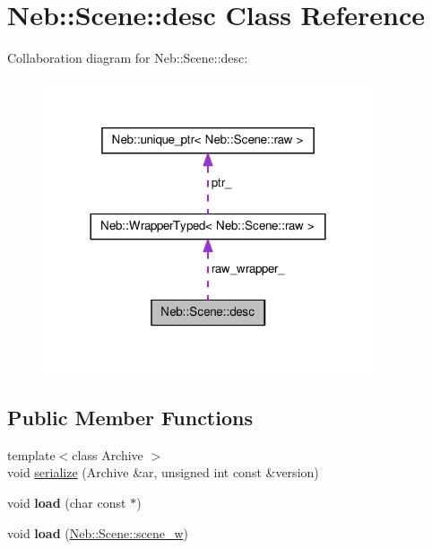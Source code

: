 \hypertarget{classNeb_1_1Scene_1_1desc}{\section{\-Neb\-:\-:\-Scene\-:\-:desc \-Class \-Reference}
\label{classNeb_1_1Scene_1_1desc}
}


\-Collaboration diagram for \-Neb\-:\-:\-Scene\-:\-:desc\-:
\nopagebreak
\begin{figure}[H]
\begin{center}
\leavevmode
\includegraphics[width=276pt]{classNeb_1_1Scene_1_1desc__coll__graph}
\end{center}
\end{figure}
\subsection*{\-Public \-Member \-Functions}
\begin{DoxyCompactItemize}
\item 
{\footnotesize template$<$class Archive $>$ }\\void \hyperlink{classNeb_1_1Scene_1_1desc_aa456a9a431a4f93be8278f6aee75b8f6}{serialize} (\-Archive \&ar, unsigned int const \&version)
\item 
\hypertarget{classNeb_1_1Scene_1_1desc_a79c8deb52884deccaef462c6ce6866a6}{void {\bfseries load} (char const $\ast$)}\label{classNeb_1_1Scene_1_1desc_a79c8deb52884deccaef462c6ce6866a6}

\item 
\hypertarget{classNeb_1_1Scene_1_1desc_aa1152d0cc91bd6585c5074c20bc49ff9}{void {\bfseries load} (\hyperlink{classNeb_1_1weak__ptr}{\-Neb\-::\-Scene\-::scene\-\_\-w})}\label{classNeb_1_1Scene_1_1desc_aa1152d0cc91bd6585c5074c20bc49ff9}

\end{DoxyCompactItemize}
